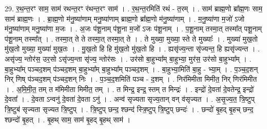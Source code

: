 \documentclass[17pt]{extarticle}
\begin{document}
29. र॒थ॒न्त॒रꣳ साम॒ साम॑ रथन्त॒रꣳ र॑थन्त॒रꣳ साम॑ । . र॒थ॒न्त॒रमिति॑ रथं - त॒रम् । . साम॑ ब्राह्म॒णो ब्रा᳚ह्म॒णः साम॒ साम॑ ब्राह्म॒णः । . ब्रा॒ह्म॒णो म॑नु॒ष्या॑णाम् मनु॒ष्या॑णाम् ब्राह्म॒णो ब्रा᳚ह्म॒णो म॑नु॒ष्या॑णाम् । . म॒नु॒ष्या॑णा म॒जो॑ ऽजो म॑नु॒ष्या॑णाम् मनु॒ष्या॑णा म॒जः । . अ॒जः प॑शू॒नाम् प॑शू॒ना म॒जो॑ ऽजः प॑शू॒नाम् । . प॒शू॒नाम् तस्मा॒त् तस्मा᳚त् पशू॒नाम् प॑शू॒नाम् तस्मा᳚त् । . तस्मा॒त् ते ते तस्मा॒त् तस्मा॒त् ते । . ते मुख्या॒ मुख्या॒ स्ते ते मुख्याः᳚ । . मुख्या॑ मुख॒तो मु॑ख॒तो मुख्या॒ मुख्या॑ मुख॒तः । . मु॒ख॒तो हि हि मु॑ख॒तो मु॑ख॒तो हि । . ह्यसृ॑ज्य॒न्ता सृ॑ज्यन्त॒ हि ह्यसृ॑ज्यन्त । . असृ॑ज्य॒ न्तोर॑स॒ उर॒सो ऽसृ॑ज्य॒न्ता सृ॑ज्य॒ न्तोर॑सः । . उर॑सो बा॒हुभ्या᳚म् बा॒हुभ्या॒ मुर॑स॒ उर॑सो बा॒हुभ्या᳚म् । . बा॒हुभ्या᳚म् पञ्चद॒शम् प॑ञ्चद॒शम् बा॒हुभ्या᳚म् बा॒हुभ्या᳚म् पञ्चद॒शम् । . बा॒हुभ्या॒मिति॑ बा॒हु - भ्या॒म् । . प॒ञ्च॒द॒शन् निर् णिष् प॑ञ्चद॒शम् प॑ञ्चद॒शन् निः । . प॒ञ्च॒द॒शमिति॑ पञ्च - द॒शम् । . निर॑मिमीता मिमीत॒ निर् णिर॑मिमीत । . अ॒मि॒मी॒त॒ तम् त म॑मिमीता मिमीत॒ तम् । . त मिन्द्र॒ इन्द्र॒ स्तम् त मिन्द्रः॑ । . इन्द्रो॑ दे॒वता॑ दे॒वतेन्द्र॒ इन्द्रो॑ दे॒वता᳚ । . दे॒वता ऽन्वनु॑ दे॒वता॑ दे॒वता ऽनु॑ । . अन्व॑ सृज्यता सृज्य॒तान् वन् व॑सृज्यत । . अ॒सृ॒ज्य॒त॒ त्रि॒ष्टुप् त्रि॒ष्टुब॑ सृज्यता सृज्यत त्रि॒ष्टुप् । . त्रि॒ष्टुप् छन्द॒ श्छन्द॑ स्त्रि॒ष्टुप् त्रि॒ष्टुप् छन्दः॑ । . छन्दो॑ बृ॒हद् बृ॒हच् छन्द॒ श्छन्दो॑ बृ॒हत् । . बृ॒हथ् साम॒ साम॑ बृ॒हद् बृ॒हथ् साम॑ । \newline
\end{document}
